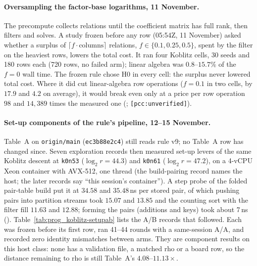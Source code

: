 \paragraph{Oversampling the factor-base logarithms, 11 November.} The
precompute collects relations until the coefficient matrix has full rank,
then filters and solves. A study frozen before any row (05:54Z, 11 November)
asked whether a surplus of $\lceil f\cdot\text{columns}\rceil$ relations,
$f\in\{0.1,0.25,0.5\}$, spent by the filter on the heaviest rows, lowers the
total cost. It ran four Koblitz cells, 30 seeds and 180 rows each (720 rows,
no failed arm); linear algebra was $0.8$--$15.7$\% of the $f=0$ wall time. The
frozen rule chose H0 in every cell: the surplus never lowered total cost.
Where it did cut linear-algebra row operations ($f=0.1$ in two cells, by
$17.9$ and $4.2$ on average), it would break even only at a price per row
operation $98$ and $14{,}389$ times the measured one
(;
\texttt{[pcc:unverified]}).

\paragraph{Set-up components of the rule's pipeline, 12--15 November.}
Table~A on \texttt{origin/main} (\texttt{ec3b88e2c4}) still reads rule v9;
no Table~A row has changed since. Seven exploration records then
measured set-up levers of the same Koblitz descent at \texttt{k0n53}
($\log_2r=44.3$) and \texttt{k0n61} ($\log_2r=47.2$), on a 4-vCPU Xeon
container with AVX-512, one thread (the build-pairing record names the
host; the later records say ``this session's container''). A step probe of the folded pair-table
build put it at $34.58$ and $35.48$\,ns per stored pair, of which pushing
pairs into partition streams took $15.07$ and $13.85$ and the counting sort
with the filter fill $11.63$ and $12.88$; forming the pairs (additions and
keys) took about 7\,ns
().
Table~\ref{tab:prog_koblitz-setupab} lists the A/B records that followed.
Each was frozen before its first row, ran 41--44 rounds with a
same-session A/A, and recorded zero identity mismatches between arms. They are component results on this host class: none has a
validation file, a matched rho or a board row, so the distance remaining to
rho is still Table~A's $4.08$--$11.13\times$.

